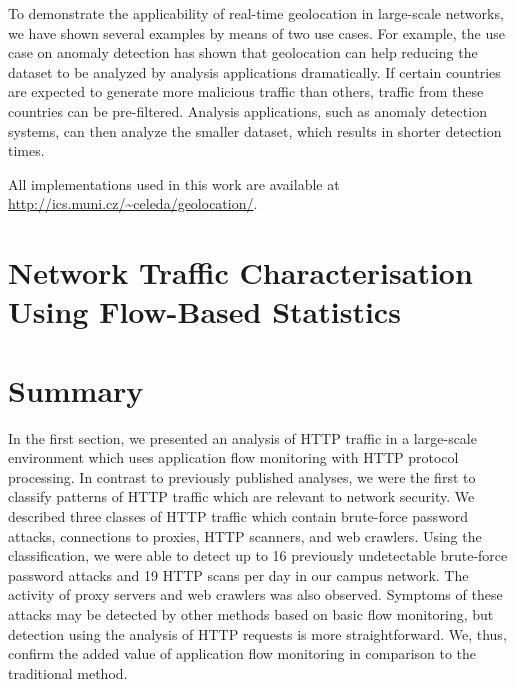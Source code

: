 To demonstrate the applicability of real-time geolocation in large-scale networks, we have shown several examples by means of two use cases. For example, the use case on anomaly detection has shown that geolocation can help reducing the dataset to be analyzed by analysis applications dramatically. If certain countries are expected to generate more malicious traffic than others, traffic from these countries can be pre-filtered. Analysis applications, such as anomaly detection systems, can then analyze the smaller dataset, which results in shorter detection times.

All implementations used in this work are available at \url{http://ics.muni.cz/~celeda/geolocation/}.

\section{Network Traffic Characterisation Using Flow-Based Statistics}\label{sec:analysis-characterisation}


\section{Summary}\label{sec:use-cases-summary}

In the first section, we presented an analysis of HTTP traffic in a large-scale environment which uses application flow monitoring with HTTP protocol processing. In contrast to previously published analyses, we were the first to classify patterns of HTTP traffic which are relevant to network security. We described three classes of HTTP traffic which contain brute-force password attacks, connections to proxies, HTTP scanners, and web crawlers. Using the classification, we were able to detect up to 16 previously undetectable brute-force password attacks and 19 HTTP scans per day in our campus network. The activity of proxy servers and web crawlers was also observed. Symptoms of these attacks may be detected by other methods based on basic flow monitoring, but detection using the analysis of HTTP requests is more straightforward. We, thus, confirm the added value of application flow monitoring in comparison to the traditional method.

